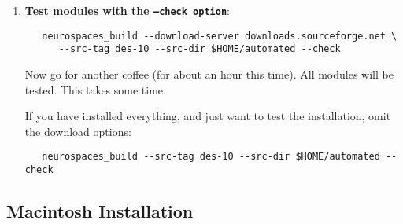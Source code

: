 \documentclass[12pt]{article}
\begin{document}
\begin{enumerate}
\item {\bf Test modules with the {\tt --check option}}:
\begin{verbatim}
   neurospaces_build --download-server downloads.sourceforge.net \
      --src-tag des-10 --src-dir $HOME/automated --check
\end{verbatim}
Now go for another coffee (for about an hour this time). All modules will be tested. This takes some time. 

If you have installed everything, and just want to test the installation, omit the download options:
\begin{verbatim}
   neurospaces_build --src-tag des-10 --src-dir $HOME/automated --check
\end{verbatim}
\end{enumerate}

\subsection*{Macintosh Installation}
\end{document}
